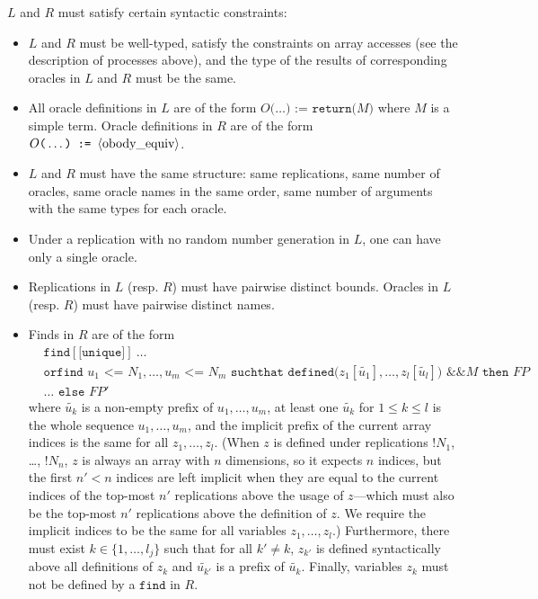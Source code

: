 \begin{itemize}
$L$ and $R$ must satisfy certain syntactic constraints:
\begin{itemize}

\item %
$L$ and $R$ must be well-typed, satisfy the constraints on
array accesses (see the description of processes above), 
and the type of the results of 
corresponding oracles in $L$ and $R$ must be the same.

\item All oracle definitions in $L$ are of the form 
$O\texttt{(}\ldots\texttt{) := return(}M\texttt{)}$
where $M$ is a simple term. %
Oracle definitions in $R$ are of the form 
$O\texttt{(}\ldots\texttt{) := }\langle\textrm{obody\_equiv}\rangle$.

\item $L$ and $R$ must have the same structure: same replications,
same number of oracles, same oracle names in the same order,
same number of arguments with the same types for each oracle.

\item Under a replication with no random number generation in $L$, 
one can have only a single oracle.

\item Replications in $L$ (resp. $R$) must have pairwise distinct
bounds. Oracles in $L$ (resp. $R$) must have pairwise distinct names.

\item %
\newcommand{\tup}[1]{\widetilde{#1}}

Finds in $R$ are of the form
\[\begin{split}
&\texttt{find}[\texttt{[unique]}]\ \ldots\\
&\texttt{orfind }u_1 \texttt{ <= } N_1, \ldots, u_m \texttt{ <= }N_m
\texttt{ suchthat defined(}z_1[\tup{u_1}], \ldots, z_l[\tup{u_l}]\texttt{) \&\& }M\texttt{ then }\mathit{FP}\\
&\ldots \texttt{ else }\mathit{FP}'
\end{split}\]
where $\tup{u_k}$ is a non-empty
prefix of $u_1, \ldots, u_m$, at least one $\tup{u_k}$ for $1 \leq
k \leq l$ is the whole sequence $u_1, \ldots, u_m$,
and the implicit prefix of the current array indices is the same
for all $z_1, \ldots, z_l$.
%
(When $z$ is defined under replications $\texttt{!}N_1$, \ldots,
$\texttt{!}N_n$, $z$ is always an array with $n$ dimensions, so it
expects $n$ indices, but the first $n'<n$ indices are left implicit
when they are equal to the current indices of the top-most $n'$ replications
above the usage of $z$---which must also be the top-most $n'$
replications above the definition of $z$. We require the implicit
indices to be the same for all variables $z_1, \ldots, z_l$.)
Furthermore, there must exist $k \in \{ 1, \ldots, l_j\}$ such that
for all $k' \neq k$, $z_{k'}$ is defined syntactically above all
definitions of $z_k$ and $\tup{u_{k'}}$ is a prefix of $\tup{u_k}$. 
%
Finally, variables $z_k$ must not be defined by a $\texttt{find}$ in $R$.



\end{itemize}
\end{itemize}
